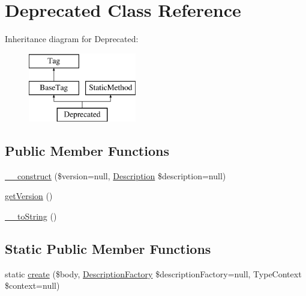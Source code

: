 \hypertarget{classphp_documentor_1_1_reflection_1_1_doc_block_1_1_tags_1_1_deprecated}{}\section{Deprecated Class Reference}
\label{classphp_documentor_1_1_reflection_1_1_doc_block_1_1_tags_1_1_deprecated}
Inheritance diagram for Deprecated\+:\begin{figure}[H]
\begin{center}
\leavevmode
\includegraphics[height=3.000000cm]{classphp_documentor_1_1_reflection_1_1_doc_block_1_1_tags_1_1_deprecated}
\end{center}
\end{figure}
\subsection*{Public Member Functions}
\begin{DoxyCompactItemize}
\item 
\mbox{\hyperlink{classphp_documentor_1_1_reflection_1_1_doc_block_1_1_tags_1_1_deprecated_a75f67561d733f42ea52230c5b289d264}{\+\_\+\+\_\+construct}} (\$version=null, \mbox{\hyperlink{classphp_documentor_1_1_reflection_1_1_doc_block_1_1_description}{Description}} \$description=null)
\item 
\mbox{\hyperlink{classphp_documentor_1_1_reflection_1_1_doc_block_1_1_tags_1_1_deprecated_afa8e7a3a646144eab50188b7a805a389}{get\+Version}} ()
\item 
\mbox{\hyperlink{classphp_documentor_1_1_reflection_1_1_doc_block_1_1_tags_1_1_deprecated_a7516ca30af0db3cdbf9a7739b48ce91d}{\+\_\+\+\_\+to\+String}} ()
\end{DoxyCompactItemize}
\subsection*{Static Public Member Functions}
\begin{DoxyCompactItemize}
\item 
static \mbox{\hyperlink{classphp_documentor_1_1_reflection_1_1_doc_block_1_1_tags_1_1_deprecated_a11e724d29317978c2b5add32da21a158}{create}} (\$body, \mbox{\hyperlink{classphp_documentor_1_1_reflection_1_1_doc_block_1_1_description_factory}{Description\+Factory}} \$description\+Factory=null, Type\+Context \$context=null)
\end{DoxyCompactItemize}
